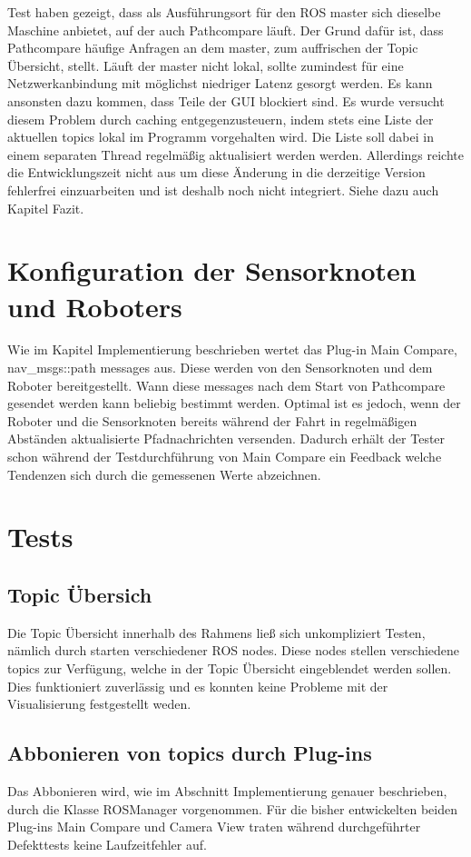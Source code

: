 Test haben gezeigt, dass als Ausführungsort für den ROS master sich dieselbe
Maschine anbietet, auf der auch Pathcompare läuft. Der Grund dafür ist, dass
Pathcompare häufige Anfragen an dem master, zum auffrischen der Topic
Übersicht, stellt. Läuft der master nicht lokal, sollte zumindest für eine
Netzwerkanbindung mit möglichst niedriger Latenz gesorgt werden. Es kann
ansonsten dazu kommen, dass Teile der GUI blockiert sind. Es wurde versucht
diesem Problem durch caching entgegenzusteuern, indem stets eine Liste der
aktuellen topics lokal im Programm vorgehalten wird. Die Liste soll dabei in einem
separaten Thread regelmäßig aktualisiert werden werden. Allerdings reichte die
Entwicklungszeit nicht aus um diese Änderung in die derzeitige Version
fehlerfrei einzuarbeiten und ist deshalb noch nicht integriert. Siehe dazu auch
Kapitel Fazit.


\section{Konfiguration der Sensorknoten und Roboters}

Wie im Kapitel Implementierung beschrieben wertet das Plug-in Main Compare,
nav\_msgs::path messages aus. Diese werden von den Sensorknoten und dem Roboter
bereitgestellt. Wann diese messages nach dem Start von Pathcompare gesendet
werden kann beliebig bestimmt werden. Optimal ist es jedoch, wenn der Roboter
und die Sensorknoten bereits während der Fahrt in regelmäßigen Abständen
aktualisierte Pfadnachrichten versenden.  Dadurch erhält der Tester schon
während der Testdurchführung von Main Compare ein Feedback welche Tendenzen
sich durch die gemessenen Werte abzeichnen.

\section{Tests}

\subsection{Topic Übersich}
Die Topic Übersicht innerhalb des Rahmens ließ sich unkompliziert Testen, nämlich durch
starten verschiedener ROS nodes. Diese nodes stellen verschiedene topics zur
Verfügung, welche in der Topic Übersicht eingeblendet werden sollen. Dies
funktioniert zuverlässig und es konnten keine Probleme mit der Visualisierung
festgestellt weden.

\subsection{Abbonieren von topics durch Plug-ins}
Das Abbonieren wird, wie im Abschnitt Implementierung genauer beschrieben, durch die
Klasse ROSManager vorgenommen. Für die bisher entwickelten beiden Plug-ins Main
Compare und Camera View traten während durchgeführter Defekttests keine
Laufzeitfehler auf.

